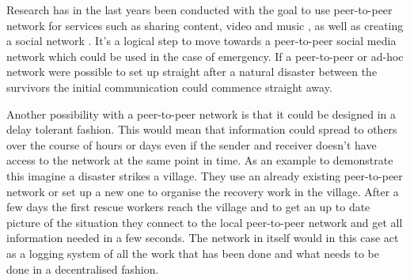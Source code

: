 Research has in the last years been conducted with the goal to use peer-to-peer network for services such as sharing content, video and music \cite{web:tribler}, as well as creating a social network \cite{web:peerson}.
It's a logical step to move towards a peer-to-peer social media network which could be used in the case of emergency.
If a peer-to-peer or ad-hoc network were possible to set up straight after a natural disaster between the survivors the initial communication could commence straight away.

Another possibility with a peer-to-peer network is that it could be designed in a delay tolerant fashion.
This would mean that information could spread to others over the course of hours or days even if the sender and receiver doesn't have access to the network at the same point in time.
As an example to demonstrate this imagine a disaster strikes a village.
They use an already existing peer-to-peer network or set up a new one to organise the recovery work in the village.
After a few days the first rescue workers reach the village and to get an up to date picture of the situation they connect to the local peer-to-peer network and get all information needed in a few seconds. 
The network in itself would in this case act as a logging system of all the work that has been done and what needs to be done in a decentralised fashion.


